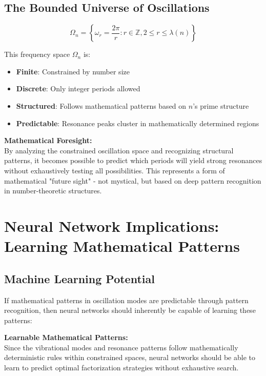 \documentclass[12pt,a4paper]{article}
\begin{document}
	\subsection{The Bounded Universe of Oscillations}
	
	\begin{equation}
		\Omega_n = \left\{\omega_r = \frac{2\pi}{r} : r \in \mathbb{Z}, 2 \leq r \leq \lambda(n)\right\}
	\end{equation}
	
	This frequency space $\Omega_n$ is:
	\begin{itemize}
		\item \textbf{Finite}: Constrained by number size
		\item \textbf{Discrete}: Only integer periods allowed
		\item \textbf{Structured}: Follows mathematical patterns based on $n$'s prime structure
		\item \textbf{Predictable}: Resonance peaks cluster in mathematically determined regions
	\end{itemize}
	
	\begin{tcolorbox}[colback=cyan!10,colframe=cyan!50,title=Predictive Principle]
		\textbf{Mathematical Foresight:} \\
		By analyzing the constrained oscillation space and recognizing structural patterns, it becomes possible to predict which periods will yield strong resonances without exhaustively testing all possibilities. This represents a form of mathematical "future sight" - not mystical, but based on deep pattern recognition in number-theoretic structures.
	\end{tcolorbox}
	
	\section{Neural Network Implications: Learning Mathematical Patterns}
	
	\subsection{Machine Learning Potential}
	
	If mathematical patterns in oscillation modes are predictable through pattern recognition, then neural networks should inherently be capable of learning these patterns:
	
	\begin{tcolorbox}[colback=green!10,colframe=green!50,title=Neural Network Hypothesis]
		\textbf{Learnable Mathematical Patterns:} \\
		Since the vibrational modes and resonance patterns follow mathematically deterministic rules within constrained spaces, neural networks should be able to learn to predict optimal factorization strategies without exhaustive search.
	\end{tcolorbox}
	
\end{document}
